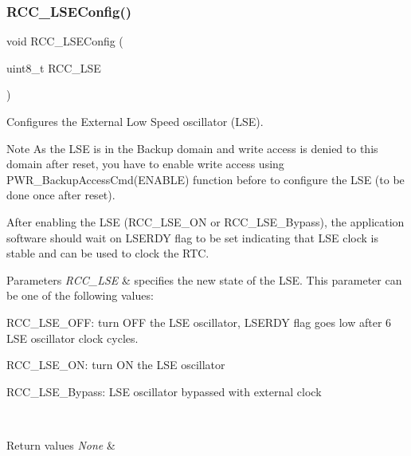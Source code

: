 \subsubsection{\texorpdfstring{R\+C\+C\+\_\+\+L\+S\+E\+Config()}{RCC\_LSEConfig()}}
{\footnotesize\ttfamily void R\+C\+C\+\_\+\+L\+S\+E\+Config (\begin{DoxyParamCaption}\item[{uint8\+\_\+t}]{R\+C\+C\+\_\+\+L\+SE }\end{DoxyParamCaption})}



Configures the External Low Speed oscillator (L\+SE). 

\begin{DoxyNote}{Note}
As the L\+SE is in the Backup domain and write access is denied to this domain after reset, you have to enable write access using P\+W\+R\+\_\+\+Backup\+Access\+Cmd(\+E\+N\+A\+B\+L\+E) function before to configure the L\+SE (to be done once after reset). ~\newline


After enabling the L\+SE (R\+C\+C\+\_\+\+L\+S\+E\+\_\+\+ON or R\+C\+C\+\_\+\+L\+S\+E\+\_\+\+Bypass), the application software should wait on L\+S\+E\+R\+DY flag to be set indicating that L\+SE clock is stable and can be used to clock the R\+TC. 
\end{DoxyNote}

\begin{DoxyParams}{Parameters}
{\em R\+C\+C\+\_\+\+L\+SE} & specifies the new state of the L\+SE. This parameter can be one of the following values\+: \begin{DoxyItemize}
\item R\+C\+C\+\_\+\+L\+S\+E\+\_\+\+O\+FF\+: turn O\+FF the L\+SE oscillator, L\+S\+E\+R\+DY flag goes low after 6 L\+SE oscillator clock cycles. \item R\+C\+C\+\_\+\+L\+S\+E\+\_\+\+ON\+: turn ON the L\+SE oscillator \item R\+C\+C\+\_\+\+L\+S\+E\+\_\+\+Bypass\+: L\+SE oscillator bypassed with external clock \end{DoxyItemize}
\\
\hline
\end{DoxyParams}

\begin{DoxyRetVals}{Return values}
{\em None} & \\
\hline
\end{DoxyRetVals}
\mbox{\label{group___r_c_c___group1_ga81e3ca29fd154ac2019bba6936d6d5ed}} 
